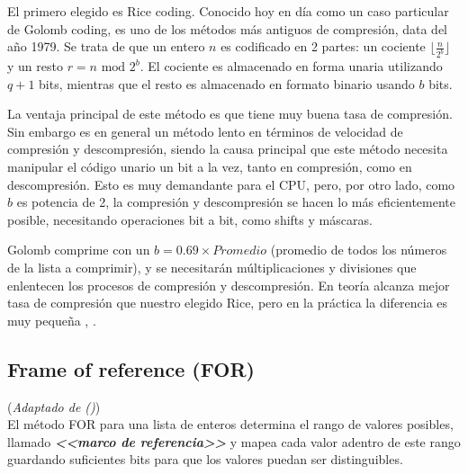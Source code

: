 El primero elegido es Rice coding. Conocido hoy en día como un caso particular de Golomb coding, es uno de los métodos más antiguos de compresión, data del año 1979. Se trata de que un entero $n$ es codificado en 2 partes: un cociente $\lfloor \frac{n}{2^b} \rfloor$ y un resto 
$r = n \text{ mod } 2^b$. El cociente es almacenado en forma unaria utilizando $q+1$ bits, mientras que el resto es almacenado en formato binario usando $b$ bits. 



La ventaja principal de este método es que tiene muy buena tasa de compresión. Sin embargo es en general un método lento en términos de velocidad de compresión y descompresión, siendo la causa principal que este método necesita manipular el código unario un bit a la vez, tanto en compresión, como en descompresión. Esto es muy demandante para el CPU, pero, por otro lado, como $b$ es potencia de 2, la compresión y descompresión se hacen lo más eficientemente posible, necesitando operaciones bit a bit, como shifts y máscaras. 

Golomb comprime con un $b= 0.69 \times Promedio$ (promedio de todos los números de la lista a comprimir), y se necesitarán múltiplicaciones y divisiones que enlentecen los procesos de compresión y descompresión. En teoría alcanza mejor tasa de compresión que nuestro elegido Rice, pero en la práctica la diferencia es muy pequeña \cite{Zhang:2008}, \cite{Buettcher2010}.


\subsection{Frame of reference (FOR)}

(\noindent \textit{Adaptado de \citet[p.~5]{Delbru10adaptiveframe} (\citeyear{Delbru10adaptiveframe})})
\\

El método FOR para una lista de enteros determina el rango de valores posibles, llamado \textit\textbf{<<marco de referencia>>} y mapea cada valor adentro de este rango guardando suficientes bits para que los valores puedan ser distinguibles. 

